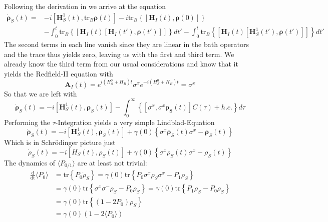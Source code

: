 	Following the derivation in  \cite{landi2022nonequilibrium} we arrive at the equation
	\begin{align*}
		\dot{		\boldsymbol{\rho}}_S(t) = &- i \left[\boldsymbol{H}_S^1(t), \text{tr}_B \boldsymbol{\rho}(t)\right]	- i \text{tr}_B \left\{\left[\boldsymbol{H}_I(t),  \boldsymbol{\rho}(0)\right]\right\} \\
		&- \int_{0}^{t} \text{tr}_B \left\{\left[\boldsymbol{H}_I(t)\left[\boldsymbol{H}_I(t'), \boldsymbol{\rho}(t')\right]\right]\right\}	dt' - \int_{0}^{t} \text{tr}_B \left\{\left[\boldsymbol{H}_I(t)\left[\boldsymbol{H}_S^1(t'), \boldsymbol{\rho}(t')\right]\right]\right\}	dt'
	\end{align*}
	The second terms in each line vanish since they are linear in the bath operators and the trace thus yields zero, leaving us with the first and third term. We already know the third term from our usual considerations and know that it yields the Redfield-II equation with
	\begin{equation}
		\boldsymbol{A}_I(t) =	e^{i (H_S^0 +H_B)t} \sigma^x e^{- i (H_S^0 +H_B)t} =	\sigma^x
	\end{equation}
	So that we are left with
	\begin{equation}
		\dot{		\boldsymbol{\rho}}_S(t) = - i \left[\boldsymbol{H}_S^1(t),  \boldsymbol{\rho}_S(t)\right]	- \int_{0}^{\infty} \left\{\left[\sigma^x, \sigma^x \boldsymbol{\rho_S}(t)\right]C(\tau)+h.c. \right\}d\tau
	\end{equation}
	Performing the $\tau$-Integration yields a very simple Lindblad-Equation
	\begin{equation}
		\dot{		\boldsymbol{\rho}}_S(t) =	- i \left[\boldsymbol{H}_S^1(t),  \boldsymbol{\rho}_S(t)\right] + \gamma(0) \left\{\sigma^x \boldsymbol{\rho}_S(t) \sigma^x - \boldsymbol{\rho}_S(t) \right\}
	\end{equation}
	Which is in Schrödinger picture just
	\begin{equation}
		\dot{{\rho}}_S(t) =	- i \left[{H}_S(t), {\rho}_S(t)\right] + \gamma(0) \left\{\sigma^x {\rho}_S(t) \sigma^x - {\rho}_S(t) \right\}
	\end{equation}
	The dynamics of $\langle P_{0/1} \rangle$ are at least not trivial:
	\begin{align*}
		\frac{\text{d}}{\text{dt}} \langle P_{0} \rangle &=	\text{tr}\left\{P_{0} \dot{\rho}_S\right\} = \gamma(0) \text{tr}\left\{ P_0 \sigma^x {\rho}_S \sigma^x - P_1 {\rho}_S \right\}\\
		&= \gamma(0) \text{tr}\left\{  \sigma^x \sigma^- {\rho}_S  - P_0 {\rho}_S \right\} = \gamma(0) \text{tr}\left\{  P_1 {\rho}_S  - P_0 {\rho}_S \right\} \\
		&= \gamma(0) \text{tr}\left\{  (1 - 2 P_0) {\rho}_S \right\} \\
		&= \gamma(0) (1 - 2\langle P_0 \rangle )
	\end{align*}
